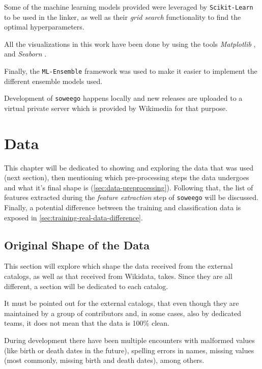 \documentclass[epsfig,a4paper,11pt,titlepage,twoside,openany]{book}
\begin{document}
Some of the machine learning models provided were leveraged by \texttt{Scikit-Learn} \cite{scikit-learn} to be used in the linker, as well as their \textit{grid search} functionality to find the optimal hyperparameters.

All the visualizations in this work have been done by using the tools \textit{Matplotlib} \cite{Hunter_Matplotlib}, and \textit{Seaborn} \cite{Seaborn}.%

Finally, the \texttt{ML-Ensemble} \cite{flennerhag:2017mlens} framework was used to make it easier to implement the different ensemble models used.


Development of \texttt{soweego} happens locally and new releases are uploaded to a virtual private server which is provided by Wikimedia for that purpose. 



\chapter{Data}
\label{chap:data}

This chapter will be dedicated to showing and exploring the data that was used (next section), then mentioning which pre-processing steps the data undergoes and what it's final shape is (\autoref{sec:data-preprocessing}). Following that, the list of features extracted during the \textit{feature extraction} step of \texttt{soweego} will be discussed. Finally, a potential difference between the training and classification data is exposed in \autoref{sec:training-real-data-difference}.


\section{Original Shape of the Data}
\label{sec:orig-shape-of-data}

This section will explore which shape the data received from the external catalogs, as well as that received from Wikidata, takes. Since they are all different, a section will be dedicated to each catalog. 

It must be pointed out for the external catalogs, that even though they are maintained by a group of contributors and, in some cases, also by dedicated teams, it does not mean that the data is 100\% clean. 

During development there have been multiple encounters with malformed values (like birth or death dates in the future), spelling errors in  names, missing values (most commonly, missing birth and death dates), among others. 
\end{document}
